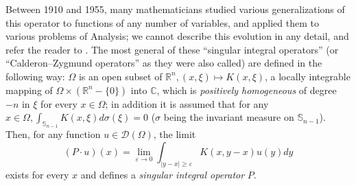 \documentclass[12pt,a4paper,leqno,twoside]{extbook}
\newcommand{\C}{\mathbb{C}}
\newcommand{\R}{\mathbb{R}}
\newcommand{\Sph}{\mathbb{S}}
\begin{document}
Between 1910 and 1955, many mathematicians studied various generalizations of this operator to functions of any number of variables, and applied them to various problems of Analysis; we cannot describe this evolution in any detail, and refer the reader to \cite{197}. The most general of these ``singular integral operators'' (or ``Calderon--Zygmund operators'' as they were also called) are defined in the following way: \(\Omega\) is an open subset of \(\R^n, (x, \xi) \mapsto K(x, \xi)\), a locally integrable mapping of \(\Omega \times (\R^n - \{0\})\) into \(\C\), which is \emph{positively homogeneous} of degree \(-n\) in \(\xi\) for every \(x \in \Omega\); in addition it is assumed that for any \(x \in \Omega, \int_{\Sph_{n-1}} K(x, \xi) d\sigma(\xi) = 0\) (\(\sigma\) being the invariant measure on \(\Sph_{n-1}\)). Then, for any function \(u \in \mathcal{D}(\Omega)\), the limit
\begin{equation}
    \label{eq:9.36}
    (P \cdot u)(x) = \lim_{\varepsilon \to 0} \int_{|y-x| \geq \varepsilon} K(x,y-x)u(y)dy
\end{equation}
exists for every \(x\) and defines a \emph{singular integral operator} \(P\).
\end{document}
